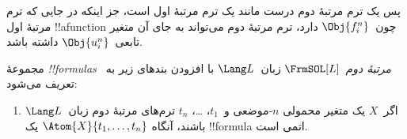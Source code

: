 \documentclass[../../../include/open-logic-section]{subfiles}
\begin{document}
\begin{explain}
پس یک ترم مرتبهٔ دوم درست مانند یک ترم مرتبهٔ اول است، جز اینکه در جایی
که ترم مرتبهٔ اول !!a{function} چون~$\Obj{f^n_i}$ دارد، ترم مرتبهٔ دوم
می‌تواند به جای آن متغیر تابعی~$\Obj{u^n_i}$ داشته باشد.
\end{explain}

\begin{defn}
مجموعهٔ \emph{!!{formula}s مرتبهٔ دوم}~$\FrmSOL[L]$ زبان~$\Lang L$ با
افزودن بندهای زیر به~ تعریف می‌شود:
\begin{enumerate}
\item اگر~$X$ یک متغیر محمولی $n$-موضعی و~$t_1$، \dots، $t_n$
  ترم‌های مرتبهٔ دوم زبان~$\Lang L$ باشند، آنگاه
  $\Atom{X}{t_1,\ldots, t_n}$ یک !!{formula} اتمی است.




\end{enumerate}
\end{defn}
\end{document}

